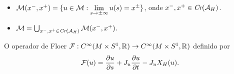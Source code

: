 \documentclass{beamer}
\begin{document}
\begin{footnotesize}
\begin{frame}
		 \begin{itemize} 	
		 	
		 	
		 	\item   $\mathcal{M}(x^{-}, x^{+}) =\{u \in \mathcal{M}: \lim\limits_{s\to \pm \infty}u(s) = x^{\pm}\}$, onde  $x^{-}, x^{+}\in \textit{Cr}(\mathcal{A}_{H})$. 
		 	
		 	\item $ \mathcal{M} = \bigcup_{x^{-}, x^{+} \in \textit{Cr}(\mathcal{A}_{H})} \mathcal{M}(x^{-}, x^{+}).$ 	
		 	
		 \end{itemize} 		
			
		\begin{definition} O operador de Floer $\mathcal{F}:C^{\infty}(M\times S^{1}, \mathbb{R}^{})\to C^{\infty}(M\times S^{1}, \mathbb{R}^{})$ definido por  $$ \mathcal{F}(u)=\frac{\partial u}{\partial s} + J_{u}\frac{\partial u}{\partial t} - J_{u}X_{H}(u). 	$$ \end{definition}
		
		\end{frame}
	

\end{footnotesize}
\end{document}
